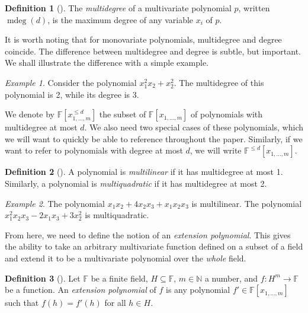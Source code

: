 \documentclass[english,12pt]{reedthesis}
\theoremstyle{plain}
\theoremstyle{definition}
\newtheorem{defn}[defn]{Definition}
\theoremstyle{remark}
\newtheorem{example}{Example}[thm]
\DeclareMathOperator{\mdeg}{mdeg}
\begin{document}
\begin{defn}[{\cite[8]{AW09}}]\label{def:mdeg}
  The \emph{multidegree} of a multivariate polynomial $p$, written $\mdeg(d)$,
  is the maximum degree of any variable $x_{i}$ of $p$.
\end{defn}

It is worth noting that for monovariate polynomials, multidegree and degree
coincide. The difference between multidegree and degree is subtle, but
important. We shall illustrate the difference with a simple example.

\begin{example}
  Consider the polynomial $x_{1}^{2}x_{2} + x_{2}^{2}$. The multidegree of this
  polynomial is 2, while its degree is 3.
\end{example}

We denote by $\mathbb{F}[x_{1, \ldots, m}^{\le d}]$ the subset of
$\mathbb{F}[x_{1, \ldots, m}]$ of polynomials with multidegree at most $d$. We also
need two special cases of these polynomials, which we will want to quickly be
able to reference throughout the paper. Similarly, if we want to refer to
polynomials with degree at most $d$, we will write $\mathbb{F}^{\le d}[x_{1, \ldots, m}]$.

\begin{defn}[{\cite[8]{AW09}}]\label{def:mlin}
  A polynomial is \emph{multilinear} if it has multidegree at most 1. Similarly,
  a polynomial is \emph{multiquadratic} if it has multidegree at most 2.
\end{defn}

\begin{example}
  The polynomial $x_{1}x_{2} + 4x_{2}x_{3} + x_{1}x_{2}x_{3}$ is multilinear. The
  polynomial $x_{1}^{2}x_{2}x_{3} - 2x_{1}x_{3} + 3x_{2}^{2}$ is multiquadratic.
\end{example}

From here, we need to define the notion of an \emph{extension polynomial}. This
gives the ability to take an arbitrary multivariate function defined on a subset
of a field and extend it to be a multivariate polynomial over the \emph{whole}
field.

\begin{defn}[{\cite[8]{AW09}}]\label{def:ext-poly}
  Let $\mathbb{F}$ be a finite field, $H \subseteq \mathbb{F}$, $m \in \mathbb{N}$ a number, and
  $f\colon H^{m} \rightarrow \mathbb{F}$ be a function. An \emph{extension polynomial} of
  $f$ is any polynomial $f' \in \mathbb{F}[x_{1, \ldots, m}]$ such that $f(h) = f'(h)$
  for all $h \in H$.
\end{defn}
\end{document}

